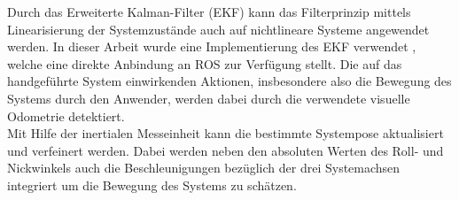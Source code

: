 
Durch das Erweiterte Kalman-Filter (EKF) kann das Filterprinzip mittels Linearisierung der Systemzustände auch auf nichtlineare Systeme angewendet werden. In dieser Arbeit wurde eine Implementierung des EKF verwendet \cite{EKF}, welche eine direkte Anbindung an ROS zur Verfügung stellt. Die auf das handgeführte System einwirkenden Aktionen, insbesondere also die Bewegung des Systems durch den Anwender, werden dabei durch die verwendete visuelle Odometrie detektiert.\\
Mit Hilfe der inertialen Messeinheit kann die bestimmte Systempose aktualisiert und verfeinert werden. Dabei werden neben den absoluten Werten des Roll- und Nickwinkels auch die Beschleunigungen bezüglich der drei Systemachsen integriert um die Bewegung des Systems zu schätzen.\\



%
%
